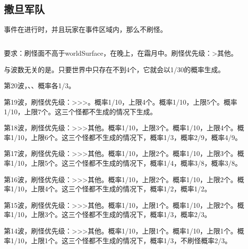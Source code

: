 \subsection{撒旦军队}
事件在进行时，并且玩家在事件区域内，那么不刷怪。

\subsection{}
要求：刷怪面不高于worldSurface，在晚上，在霜月中。刷怪优先级：>其他。

与波数无关的是。只要世界中只存在不到4个，它就会以1/30的概率生成。

第20波，、、概率各1/3。

第19波，刷怪优先级：>>>。概率1/10，上限4个。概率1/10，上限5个。概率1/10，上限7个。这三个怪都不生成的情况下生成。

第18波，刷怪优先级：>>>其他。概率1/10，上限3个。概率1/10，上限4个。概率1/10，上限6个。这三个怪都不生成的情况下，概率1/3，概率2/9，概率4/9。

第17波，刷怪优先级：>>>其他。概率1/10，上限2个。概率1/10，上限3个。概率1/10，上限5个。这三个怪都不生成的情况下，概率1/4，概率3/8，概率3/8。

第16波，刷怪优先级：>>>其他。概率1/10，上限2个。概率1/10，上限2个。概率1/10，上限4个。这三个怪都不生成的情况下，概率1/2，概率1/2。

第15波，刷怪优先级：>>>其他。概率1/10，上限1个。概率1/10，上限2个。概率1/10，上限3个。这三个怪都不生成的情况下，概率1/3，概率2/3。

第14波，刷怪优先级：>>>其他。概率1/10，上限1个。概率1/10，上限1个。概率1/10，上限1个。这三个怪都不生成的情况下，概率1/3，不刷怪概率2/3。

